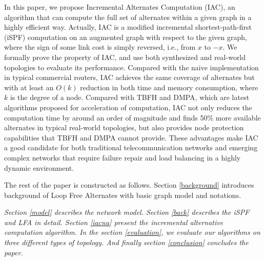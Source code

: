 In this paper, we propose Incremental Alternates Computation (IAC), an algorithm that can
compute the full set of alternates within a given graph in a highly efficient way.
Actually, IAC is a modified incremental shortest-path-first (iSPF) computation
on an augmented graph with respect to the given graph, where the sign of some link cost
is simply reversed, i.e., from $x$ to $-x$. We formally prove the property of IAC,
and use both synthesized and real-world topologies to evaluate its performance.
Compared with the naive implementation in typical commercial routers, IAC achieves the same coverage of alternates but
with at least an $O(k)$ reduction in both time and memory consumption, where $k$ is the degree of a node.
Compared with TBFH and DMPA, which are latest algorithms proposed for acceleration of computation,
IAC not only reduces the computation time by around an order of magnitude
and finds 50\% more available alternates in typical real-world topologies, but also
provides  node protection capabilities that TBFH and DMPA cannot provide.
These advantages make IAC a good candidate for both traditional telecommunication networks
and emerging complex networks that require failure repair and load balancing
in a highly dynamic environment.
\iffalse
Our contributions are summarized as follows:
\begin{itemize}
\item We propose an incremental alternates computation (IAC) algorithm based on iSPF, which can compute all the next hops satisfied DC rule. %
\item Theoretical analysis indicates that the computation complexity of IAC is less than that of constructing a shortest path tree and  can provide the same network availability as DC.
\item We propose an IAC algorithm which can  efficiently calculate
the minimum cost of all its neighbors to all other nodes of the
network on the shortest path tree rooted at the compute node. Therefore
IAC can completely and efficiently deal with LFA problem.
\item Theoretical analysis and experiments results indicate that IAC can provide the same network availability as LFA.
\end{itemize}
\fi

The rest of the paper is constructed as follows.
Section \ref{background} introduces background of Loop Free Alternates with basic graph model and notations.

{\em Section \ref{model}  describes the network model.
Section \ref{back} describes the iSPF and LFA in detail.
Section  \ref{iacna}  present the incremental alternative computation algorithm.
In the section \ref{evaluation}, we evaluate our algorithms on three different types of topology.  And finally section \ref{conclusion} concludes the paper.
}




